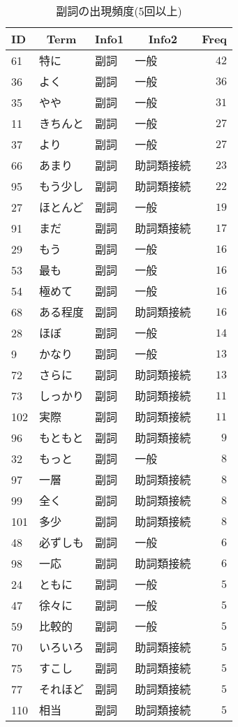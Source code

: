 %
\begin{table}[!tbp]
\caption{副詞の出現頻度(5回以上)\label{tab:副詞}} 
\begin{center}
\begin{tabular}{llllr}
\toprule
\multicolumn{1}{l}{ID}&\multicolumn{1}{c}{Term}&\multicolumn{1}{c}{Info1}&\multicolumn{1}{c}{Info2}&\multicolumn{1}{c}{Freq}\tabularnewline
\midrule
61&特に&副詞&一般&$42$\tabularnewline
36&よく&副詞&一般&$36$\tabularnewline
35&やや&副詞&一般&$31$\tabularnewline
11&きちんと&副詞&一般&$27$\tabularnewline
37&より&副詞&一般&$27$\tabularnewline
66&あまり&副詞&助詞類接続&$23$\tabularnewline
95&もう少し&副詞&助詞類接続&$22$\tabularnewline
27&ほとんど&副詞&一般&$19$\tabularnewline
91&まだ&副詞&助詞類接続&$17$\tabularnewline
29&もう&副詞&一般&$16$\tabularnewline
53&最も&副詞&一般&$16$\tabularnewline
54&極めて&副詞&一般&$16$\tabularnewline
68&ある程度&副詞&助詞類接続&$16$\tabularnewline
28&ほぼ&副詞&一般&$14$\tabularnewline
9&かなり&副詞&一般&$13$\tabularnewline
72&さらに&副詞&助詞類接続&$13$\tabularnewline
73&しっかり&副詞&助詞類接続&$11$\tabularnewline
102&実際&副詞&助詞類接続&$11$\tabularnewline
96&もともと&副詞&助詞類接続&$ 9$\tabularnewline
32&もっと&副詞&一般&$ 8$\tabularnewline
97&一層&副詞&助詞類接続&$ 8$\tabularnewline
99&全く&副詞&助詞類接続&$ 8$\tabularnewline
101&多少&副詞&助詞類接続&$ 8$\tabularnewline
48&必ずしも&副詞&一般&$ 6$\tabularnewline
98&一応&副詞&助詞類接続&$ 6$\tabularnewline
24&ともに&副詞&一般&$ 5$\tabularnewline
47&徐々に&副詞&一般&$ 5$\tabularnewline
59&比較的&副詞&一般&$ 5$\tabularnewline
70&いろいろ&副詞&助詞類接続&$ 5$\tabularnewline
75&すこし&副詞&助詞類接続&$ 5$\tabularnewline
77&それほど&副詞&助詞類接続&$ 5$\tabularnewline
110&相当&副詞&助詞類接続&$ 5$\tabularnewline
\bottomrule
\end{tabular}
\end{center}
\end{table}

